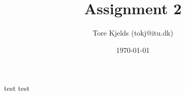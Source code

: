 \documentclass{article}
\title{Assignment 2}
\author{Tore Kjelds (tokj@itu.dk)}
\date{\today}
\begin{document}
\maketitle    
test test
\end{document}
